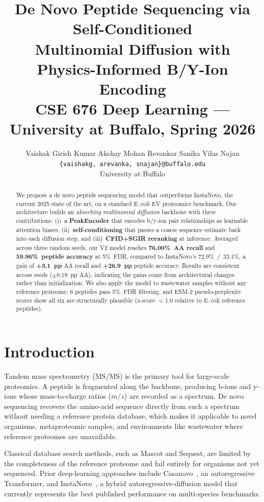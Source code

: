 \documentclass[10pt,twocolumn]{article}
\title{%
  \vspace{-0.5in}
  \textbf{De Novo Peptide Sequencing via Self-Conditioned\\
  Multinomial Diffusion with Physics-Informed B/Y-Ion Encoding}\\[4pt]
  \normalsize CSE 676 Deep Learning --- University at Buffalo, Spring 2026
}
\author{%
  Vaishak Girish Kumar \quad Akshay Mohan Revankar \quad Sanika Vilas Najan \\
  \texttt{\{vaishakg, arevanka, snajan\}@buffalo.edu} \\
  University at Buffalo
}
\date{}
\begin{document}
\maketitle
\thispagestyle{fancy}

\begin{abstract}
\noindent
We propose a de novo peptide sequencing model that outperforms InstaNovo, the current 2025 state of the art, on a standard E.\,coli EV proteomics benchmark.
Our architecture builds an \textit{absorbing multinomial diffusion} backbone with three contributions: (i)~a \textbf{PeakEncoder} that encodes b/y-ion pair relationships as learnable attention biases,
(ii)~\textbf{self-conditioning} that passes a coarse sequence estimate back into each diffusion step,
and (iii)~\textbf{CFID+SGIR reranking} at inference.
Averaged across three random seeds, our V2 model reaches
\textbf{76.00\%~AA recall} and \textbf{59.96\%~peptide accuracy} at 5\%~FDR,
compared to InstaNovo's 72.9\%~/~33.1\%,
a gain of \textbf{+3.1~pp} AA recall and \textbf{+26.9~pp} peptide accuracy.
Results are consistent across seeds ($\pm$0.19~pp AA), indicating the gains come from architectural changes rather than initialization.
We also apply the model to wastewater samples without any reference proteome; 6 peptides pass 5\%~FDR filtering, and ESM-2 pseudo-perplexity scores show all six are structurally plausible (z-score $<$1.0 relative to E.\,coli reference peptides).
\end{abstract}

\section{Introduction}

Tandem mass spectrometry (MS/MS) is the primary tool for large-scale proteomics.
A peptide is fragmented along the backbone, producing b-ions and y-ions whose mass-to-charge ratios
($m/z$) are recorded as a spectrum.
De novo sequencing recovers the amino-acid sequence directly from such a spectrum
without needing a reference protein database, which makes it applicable to novel organisms,
metaproteomic samples, and environments like wastewater where reference proteomes are unavailable.

Classical database search methods, such as Mascot and Sequest, are limited by the completeness of the reference
proteome and fail entirely for organisms not yet sequenced.
Prior deep-learning approaches include Casanovo~\citep{casanovo2023}, an autoregressive Transformer,
and InstaNovo~\citep{instanovo2024}, a hybrid autoregressive-diffusion model that currently represents
the best published performance on multi-species benchmarks.
\end{document}
